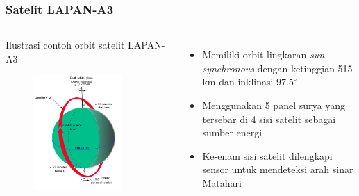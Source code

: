 \documentclass[8pt]{beamer}
\begin{document}
\begin{frame}
  \frametitle{Satelit LAPAN-A3}
  \begin{columns}[c]
      \begin{block}{\center Ilustrasi contoh orbit satelit LAPAN-A3}
      \begin{figure}
          \includegraphics[width=0.8\textwidth]{figure/orbitexample.png}
      \end{figure}
      \end{block}
      \begin{itemize}
        \item Memiliki orbit lingkaran \textit{sun-synchronous} dengan ketinggian 515 km dan inklinasi $97.5^\circ$
        \item Menggunakan 5 panel surya yang tersebar di 4 sisi satelit sebagai sumber energi
        \item Ke-enam sisi satelit dilengkapi sensor untuk mendeteksi arah sinar Matahari
      \end{itemize}
  \end{columns}
\end{frame}
\end{document}
